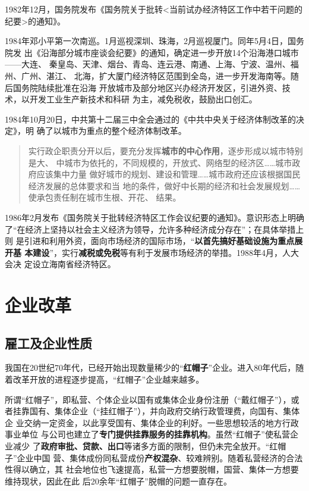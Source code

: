 1982年12月，国务院发布《国务院关于批转<当前试办经济特区工作中若干问题的
纪要>的通知》。

1984年邓小平第一次南巡。1月巡视深圳、珠海，2月巡视厦门。同年5月4日，国务院发
出《沿海部分城市座谈会纪要》的通知，确定进一步开放14个沿海港口城市——大连、
秦皇岛、天津、烟台、青岛、连云港、南通、上海、宁波、温州、福州、广州、湛江、
北海，扩大厦门经济特区范围到全岛，进一步开发海南等。随后国务院陆续批准在沿海
开放城市及部分地区兴办经济开发区，引进外资、技术，以开发工业生产新技术和科研
为主，减免税收，鼓励出口创汇。


1984年10月20日，中共第十二届三中全会通过的《中共中央关于经济体制改革的决定》，明
确了以城市为重点的整个经济体制改革。
\begin{quotation}
  实行政企职责分开以后，要充分发挥\textbf{城市的中心作用}，逐步形成以城市特别是大、
  中城市为依托的，不同规模的，开放式、网络型的经济区……城市政府应该集中力量
  做好城市的规划、建设和管理……城市政府还应该根据国民经济发展的总体要求和当
  地的条件，做好中长期的经济和社会发展规划……使承包责任制在城市生根、开花、
  结果。
\end{quotation}

1986年2月发布《国务院关于批转经济特区工作会议纪要的通知》。意识形态上明确
了“在经济上坚持以社会主义经济为领导，允许多种经济成分存在”；在具体举措上则
是引进和利用外资，面向市场经济的国际市场，“\textbf{以首先搞好基础设施为重点展开基
  本建设}”，实行\textbf{减税或免税}等有利于发展市场经济的举措。1988年4月，人大会决
定设立海南省经济特区。


\section{企业改革}

\subsection{雇工及企业性质}

我国在20世纪70年代，已经开始出现数量稀少的“\textbf{红帽子}”企业。进入80年代后，随
着改革开放的进程逐步提高，“红帽子”企业越来越多。

所谓“红帽子”，即私营、个体企业以国有或集体企业身份注册（“戴红帽子”），或
者挂靠国有、集体企业（“挂红帽子”），并向政府交纳行政管理费，向国有、集体企
业交纳一定资金，以此享受国有、集体企业的利好。一些思想较活的地方行政事业单位
与公司也建立了\textbf{专门提供挂靠服务的挂靠机构}。虽然“红帽子”使私营企业减少
了\textbf{政府审批、贷款、出口}等诸多方面的限制，但仍未完全放开。“红帽子”企业中国
营、集体成份同私营成份\textbf{产权混杂}、较难辨别。随着私营经济的合法性得以确立，其
社会地位也飞速提高，私营一方想要脱帽，国营、集体一方想要维持现状，因此在此
后20余年“红帽子”脱帽的问题一直存在。

